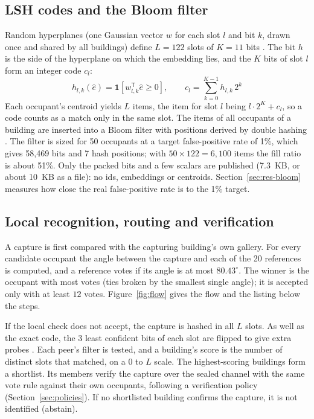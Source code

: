 \documentclass[12pt,a4paper,oneside]{report}
\begin{document}
\subsection{LSH codes and the Bloom filter}
Random hyperplanes (one Gaussian vector $w$ for each slot $l$ and bit $k$, drawn once and shared by all buildings) define $L=122$ slots of $K=11$ bits \cite{ref14}. The bit $h$ is the side of the hyperplane on which the embedding lies, and the $K$ bits of slot $l$ form an integer code $c_l$:
\begin{equation}\label{eq:hash}
h_{l,k}(\hat{e})=\mathbf{1}\!\left[w_{l,k}^{\mathsf{T}}\hat{e}\geq 0\right],\qquad c_l=\sum_{k=0}^{K-1}h_{l,k}\,2^{k}
\end{equation}
Each occupant's centroid yields $L$ items, the item for slot $l$ being $l\cdot 2^{K}+c_l$, so a code counts as a match only in the same slot. The items of all occupants of a building are inserted into a Bloom filter \cite{ref12} with positions derived by double hashing \cite{ref16}. The filter is sized for 50 occupants at a target false-positive rate of 1\%, which gives 58,469 bits and 7 hash positions; with $50\times 122=6{,}100$ items the fill ratio is about 51\%. Only the packed bits and a few scalars are published (7.3~KB, or about 10~KB as a file): no ids, embeddings or centroids. Section~\ref{sec:res-bloom} measures how close the real false-positive rate is to the 1\% target.

\subsection{Local recognition, routing and verification}
A capture is first compared with the capturing building's own gallery. For every candidate occupant the angle between the capture and each of the 20 references is computed, and a reference votes if its angle is at most $80.43^{\circ}$. The winner is the occupant with most votes (ties broken by the smallest single angle); it is accepted only with at least $12$ votes. Figure~\ref{fig:flow} gives the flow and the listing below the steps.

If the local check does not accept, the capture is hashed in all $L$ slots. As well as the exact code, the $3$ least confident bits of each slot are flipped to give extra probes \cite{ref15}. Each peer's filter is tested, and a building's score is the number of distinct slots that matched, on a 0 to $L$ scale. The highest-scoring buildings form a shortlist. Its members verify the capture over the sealed channel with the same vote rule against their own occupants, following a verification policy (Section~\ref{sec:policies}). If no shortlisted building confirms the capture, it is not identified (abstain).
\end{document}
